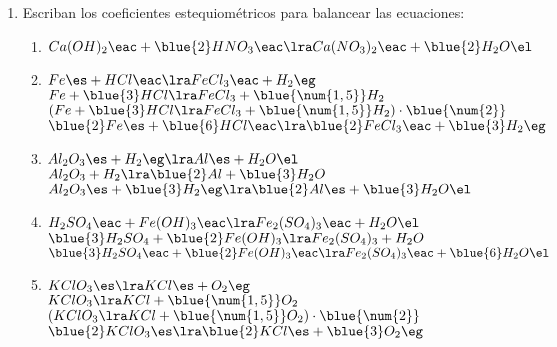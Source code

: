 \documentclass[../Práctica.root.tex]{subfiles}
\begin{document}
\begin{enumerate}
    \item Escriban los coeficientes estequiométricos para balancear las ecuaciones:
          \begin{enumerate}
              \item $Ca(OH)_2 \eac + \blue{2}HNO_3 \eac \lra Ca(NO_3)_2 \eac + \blue{2}H_2O \el$
              \item $Fe \es + HCl \eac \lra FeCl_3 \eac + H_2 \eg$ \\
                    $Fe + \blue{3}HCl \lra FeCl_3 + \blue{\num{1,5}}H_2$ \\
                    $(Fe + \blue{3}HCl \lra FeCl_3 + \blue{\num{1,5}}H_2)\cdot\blue{\num{2}}$ \\
                    $\blue{2}Fe \es + \blue{6}HCl \eac \lra \blue{2}FeCl_3 \eac + \blue{3}H_2 \eg$
              \item $Al_2O_3 \es + H_2 \eg \lra Al \es + H_2O \el$ \\
                    $Al_2O_3 + H_2 \lra \blue{2}Al + \blue{3}H_2O$ \\
                    $Al_2O_3 \es + \blue{3}H_2 \eg \lra \blue{2}Al \es + \blue{3}H_2O \el$
              \item $H_2SO_4 \eac + Fe(OH)_3 \eac \lra Fe_2(SO_4)_3 \eac + H_2O \el$ \\
                    $\blue{3}H_2SO_4 + \blue{2}Fe(OH)_3 \lra Fe_2(SO_4)_3 + H_2O$ \\
                    $\blue{3}H_2SO_4 \eac + \blue{2}Fe(OH)_3 \eac \lra Fe_2(SO_4)_3 \eac + \blue{6}H_2O \el$
              \item $KClO_3 \es \lra KCl \es + O_2 \eg$ \\
                    $KClO_3 \lra KCl + \blue{\num{1,5}}O_2$ \\
                    $(KClO_3 \lra KCl + \blue{\num{1,5}}O_2)\cdot\blue{\num{2}}$ \\
                    $\blue{2}KClO_3 \es \lra \blue{2}KCl \es + \blue{3}O_2 \eg$
          \end{enumerate}


\end{enumerate}
\end{document}
